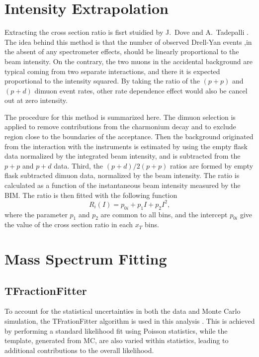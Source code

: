\documentclass[../main.tex]{subfiles}
\begin{document}
\section{Intensity Extrapolation}
\label{sec:extrapolation}
Extracting the cross section ratio is fisrt stuidied by J.~Dove \cite{dove2020} and A.~Tadepalli
\cite{tadepalli2019}. The idea behind this method is that the number of observed Drell-Yan
events ,in the absent of any spectrometer effects, should be linearly proportional to the beam
intensity. On the contrary, the two muons in the accidental background are typical coming from two separate interactions, and there it is expected proportional to the intensity squared. By taking the ratio of the
$(p+p)$ and $(p+d)$ dimuon event rates, other rate dependence effect would also be cancel out
at zero intensity.

The procedure for this method is summarized here. The dimuon selection is applied to remove contributions
from the charmonium decay and to exclude region close to the boundaries of the acceptance.
Then the background originated from the interaction with the instruments is estimated by using
the empty flask data normalized by the integrated beam intensity, and is subtracted from the
$p+p$ and $p+d$ data. Third, the $(p+d)/2(p+p)$ ratios are formed by empty flask subtracted
dimuon data, normalized by the beam intensity. The ratio is calculated as a function of the
instantaneous beam intensity measured by the BIM. The ratio is then fitted with the following function
\begin{equation}
	R_i \left(I\right) = p_{0i} + p_1 I + p_2 I^2,
\end{equation}
where the parameter $p_1$ and $p_2$ are common to all bins, and the intercept $p_{0i}$ give
the value of the cross section ratio in each $x_T$ bins.

\section{Mass Spectrum Fitting}

\subsection{TFractionFitter}
To account for the statistical uncertainties in both the data and Monte Carlo
simulation, the TFrationFitter algorithm is used in this analysis \cite{barlow1993}.
This is achieved by performing a standard likelihood fit using Poisson statistics,
while the template, generated from MC, are also varied within statistics, leading
to additional contributions to the overall likelihood.
\end{document}
